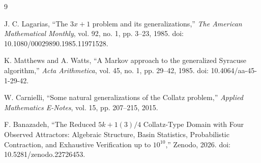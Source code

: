 \documentclass[11pt]{article}
\begin{document}
\begin{thebibliography}{9}

J. C. Lagarias,
``The $3x+1$ problem and its generalizations,''
\emph{The American Mathematical Monthly},
vol. 92, no. 1, pp. 3--23, 1985.
doi: 10.1080/00029890.1985.11971528.

K. Matthews and A. Watts,
``A Markov approach to the generalized Syracuse algorithm,''
\emph{Acta Arithmetica},
vol. 45, no. 1, pp. 29--42, 1985.
doi: 10.4064/aa-45-1-29-42.

W. Carnielli,
``Some natural generalizations of the Collatz problem,''
\emph{Applied Mathematics E-Notes},
vol. 15, pp. 207--215, 2015.

F. Banazadeh,
``The Reduced $5k+1(3)/4$ Collatz-Type Domain with Four Observed Attractors:
Algebraic Structure, Basin Statistics, Probabilistic Contraction, and
Exhaustive Verification up to $10^{10}$,''
Zenodo, 2026.
doi: 10.5281/zenodo.22726453.

\end{thebibliography}
\end{document}

